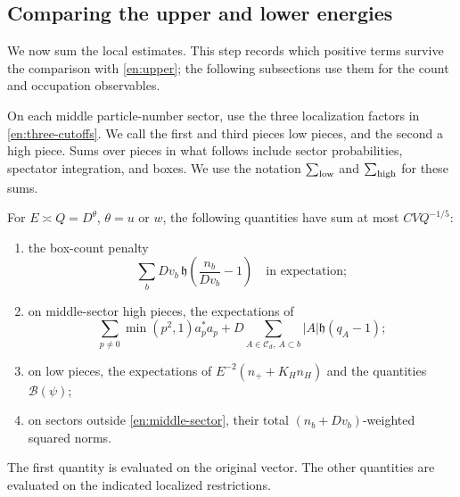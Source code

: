 \subsection{Comparing the upper and lower energies}

We now sum the local estimates.  This step records which positive terms
survive the comparison with \eqref{en:upper}; the following
subsections use them for the count and occupation observables.

On each middle particle-number sector, use the three localization
factors in \eqref{en:three-cutoffs}.  We call the first and third pieces
low pieces, and the second a high piece.  Sums over pieces in what follows
include sector probabilities, spectator integration, and boxes.  We use
the notation $\sum_{\rm low}$ and $\sum_{\rm high}$ for these sums.

\begin{lemma}\label{en:surplus}
For $E\asymp Q=D^\theta$, $\theta=u$ or $w$, the following quantities have
sum at most $CVQ^{-1/5}$:
\begin{enumerate}
\item the box-count penalty
\[
 \sum_b Dv_b\,\mathfrak h\left(\frac{n_b}{Dv_b}-1\right)
       \quad\text{in expectation};
\]
\item on middle-sector high pieces, the expectations of
\[
 \sum_{p\ne0}\min(p^2,1)a_p^*a_p
       +D\sum_{A\in\mathcal C_d,\ A\subset b}
          |A|\mathfrak h(q_A-1);
\]
\item on low pieces, the expectations of
$E^{-2}(n_++K_Hn_H)$ and the quantities $\mathcal B(\psi)$;
\item on sectors outside \eqref{en:middle-sector}, their total
$(n_b+Dv_b)$-weighted squared norms.
\end{enumerate}
The first quantity is evaluated on the original vector.  The other
quantities are evaluated on the indicated localized restrictions.
\end{lemma}

